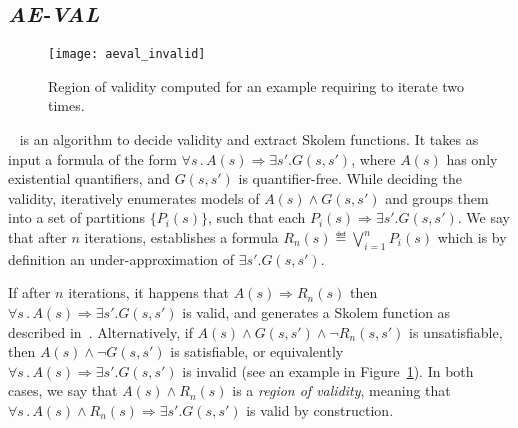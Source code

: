 \subsection{\textit{AE-VAL}}
\label{sec:aeval}

\begin{figure}[!t]
\centering
\texttt{[image: aeval\_invalid]}
\caption{Region of validity computed for an example requiring \aeval to iterate two times.}
\label{fg:aeval}
\end{figure}


\aeval~\cite{fedyukovich2015automated} is an algorithm to decide validity and extract Skolem functions.
It takes as input a formula of the form $\forall s \,.\,  A(s) \Rightarrow \exists s' . G(s,s')$, 
where $A(s)$ has only existential quantifiers, and $G(s,s')$ is quantifier-free.
%
While deciding the validity, \aeval iteratively enumerates models of $A(s) \land G (s, s')$ and groups them into a set of partitions $\{P_i(s)\}$, such that each $P_i(s) \Rightarrow \exists s' . G (s, s')$.
We say that after $n$ iterations, \aeval establishes a formula $R_n(s) \eqdef \bigvee_{i=1}^n P_i(s)$ which is by definition an under-approximation of $\exists s' . G (s, s')$. 

If after $n$ iterations, it happens that $A(s) \Rightarrow R_n(s)$ then $\forall s \,.\,  A(s) \Rightarrow \exists s' . G(s,s')$ is valid, and \aeval generates a Skolem function as described in~\cite{katis2016synthesis}.
Alternatively, if $A(s) \land  G (s, s') \land \neg{R_n (s, s')}$ is unsatisfiable, then $A(s) \land \neg G (s, s')$ is satisfiable, or equivalently $\forall s \,.\,  A(s) \Rightarrow \exists s' . G(s,s')$ is invalid (see an example in Figure~\ref{fg:aeval}).
In both cases, we say that $A(s) \land R_n(s)$ is a \emph{region of validity}, meaning that $\forall s \,.\,  A(s) \land R_n(s) \Rightarrow \exists s' . G(s,s')$ is valid by construction. 

